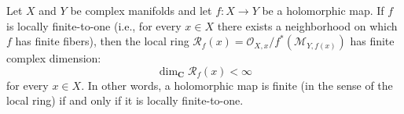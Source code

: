 Let $X$ and $Y$ be complex manifolds and let $f: X \to Y$ be a holomorphic map. If $f$ is locally finite-to-one (i.e., for every $x \in X$ there exists a neighborhood on which $f$ has finite fibers), then the local ring $\mathcal{R}_f(x) = \mathcal{O}_{X,x} / f^*(\mathcal{M}_{Y,f(x)})$ has finite complex dimension:
$$\dim_{\mathbf{C}} \mathcal{R}_f(x) < \infty$$
for every $x \in X$. In other words, a holomorphic map is finite (in the sense of the local ring) if and only if it is locally finite-to-one.
